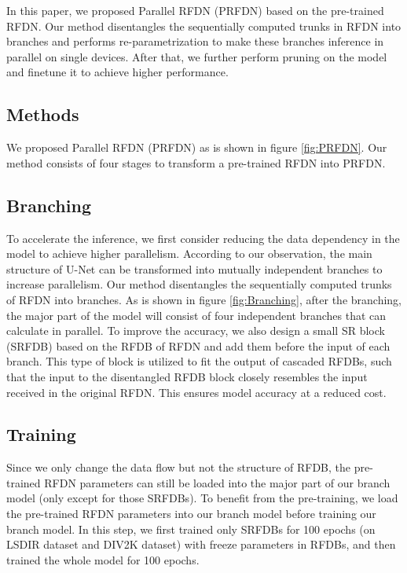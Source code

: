 \documentclass[10pt,twocolumn,letterpaper]{article}
\begin{document}
In this paper, we proposed Parallel RFDN (PRFDN) based on the pre-trained RFDN. Our method disentangles the sequentially computed trunks in RFDN into branches and performs re-parametrization to make these branches inference in parallel on single devices. After that, we further perform pruning on the model and finetune it to achieve higher performance.


\subsection{Methods}

We proposed Parallel RFDN (PRFDN) as is shown in figure \ref{fig:PRFDN}.
Our method consists of four stages to transform a pre-trained RFDN\cite{liu2020residual} into PRFDN.

\subsection{Branching}
To accelerate the inference, we first consider reducing the data dependency in the model to achieve higher parallelism. 
According to our observation, the main structure of U-Net can be transformed into mutually independent branches to increase parallelism. 
Our method disentangles the sequentially computed trunks of RFDN into branches. 
As is shown in figure \ref{fig:Branching}, after the branching, the major part of the model will consist of four independent branches that can calculate in parallel. 
To improve the accuracy, we also design a small SR block (SRFDB) based on the RFDB of RFDN and add them before the input of each branch. 
This type of block is utilized to fit the output of cascaded RFDBs, such that the input to the disentangled RFDB block closely resembles the input received in the original RFDN.
This ensures model accuracy at a reduced cost.

\subsection{Training}
Since we only change the data flow but not the structure of RFDB, the pre-trained RFDN parameters can still be loaded into the major part of our branch model (only except for those SRFDBs). 
To benefit from the pre-training, we load the pre-trained RFDN parameters into our branch model before training our branch model.
In this step, we first trained only SRFDBs for 100 epochs (on LSDIR dataset and DIV2K dataset) with freeze parameters in RFDBs, and then trained the whole model for 100 epochs.
\end{document}
